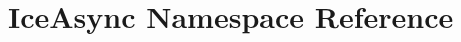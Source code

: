 \hypertarget{namespace_ice_async}{
\section{IceAsync Namespace Reference}
\label{namespace_ice_async}
}
